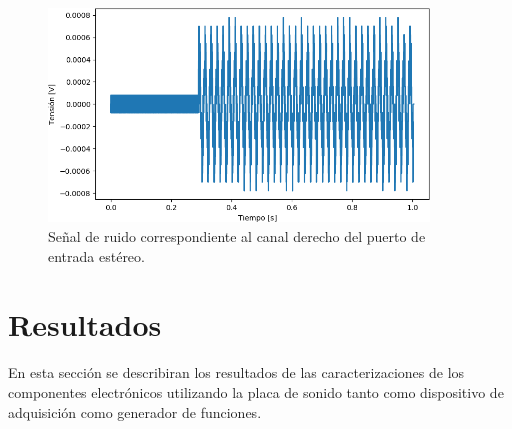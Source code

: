\documentclass[a4paper,11pt]{article}
\begin{document}
	\begin{figure}[h]
		\centering
		\includegraphics[width=0.9\textwidth]{imagenes/RuidoCanalDerecho.png}
		\caption{Señal de ruido correspondiente al canal derecho del
puerto de entrada estéreo.}
        \label{fig:RuidoDerecho}
	\end{figure}
\clearpage

\section{Resultados}
\label{sec:resultados}

En esta sección se describiran los resultados de las caracterizaciones de los componentes electrónicos utilizando la placa de sonido tanto como dispositivo de adquisición como generador de funciones. 
\end{document}
